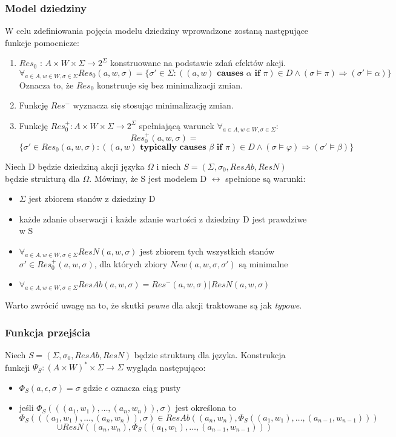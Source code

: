 \documentclass{article}
\begin{document}
\subsubsection{Model dziedziny}
W celu zdefiniowania pojęcia modelu dziedziny wprowadzone zostaną następujące funkcje pomocnicze:
\begin{enumerate}
	\item $Res_{0}$ : $A \times W \times \Sigma \to 2^{\Sigma}$ konstruowane na podstawie zdań efektów akcji.
	\[ \forall_{a \in A, w \in W, \sigma \in \Sigma} Res_{0}(a,w,\sigma) = \{\sigma' \in \Sigma: ((a, w) \textbf{ causes } \alpha \textbf{ if } \pi) \in D \land (\sigma \models \pi) \Rightarrow (\sigma' \models \alpha) \}  \]
	Oznacza to, że $Res_{0}$ konstruuje się bez minimalizacji zmian.
	\item Funkcję $Res^{-}$ wyznacza się stosując minimalizację zmian.
	\item Funkcję $Res_{0}^{+} : A \times W \times \Sigma \to 2^{\Sigma}$ spełniającą warunek $\forall_{a \in A, w \in W, \sigma \in \Sigma}$:
	\[ Res_{0}^{+}(a, w,\sigma) = \]
	\[ \{\sigma' \in Res_{0}(a, w,\sigma) : ((a, w) \textbf{ typically causes } \beta \textbf{ if } \pi) \in D \land (\sigma \models \varphi) \Rightarrow (\sigma' \models \beta) \}  \]
\end{enumerate}

Niech D będzie dziedziną akcji języka $\Omega$ i niech $S=(\Sigma, \sigma_{0}, ResAb, ResN)$ będzie strukturą dla $\Omega$. Mówimy, że S jest modelem D $\leftrightarrow$ spełnione są warunki:
\begin{itemize}
	\item $\Sigma$ jest zbiorem stanów z dziedziny D
	\item każde zdanie obserwacji i każde zdanie wartości z dziedziny D jest prawdziwe w S
	\item $\forall_{ a \in A, w \in W, \sigma \in \Sigma } ResN(a, w, \sigma)$ jest zbiorem tych wszystkich stanów $\sigma' \in Res_{0}^{+}(a, w, \sigma)$, dla których zbiory $New(a, w, \sigma, \sigma')$ są minimalne
	\item $\forall_{a \in A, w \in W, \sigma \in \Sigma} ResAb(a, w, \sigma) = Res^{-}(a, w, \sigma) | ResN(a, w, \sigma)$
\end{itemize}
Warto zwrócić uwagę na to, że skutki \textit{pewne} dla akcji traktowane są jak \textit{typowe}.

\subsubsection{Funkcja przejścia}
Niech $S=(\Sigma,\sigma_{0},ResAb,ResN)$ będzie strukturą dla języka. Konstrukcja funkcji $\Psi_{S} : (A \times W)^{*} \times \Sigma \to \Sigma$ wygląda następująco:
\begin{itemize}
	\item $\Phi_{S}(a,\epsilon,\sigma)=\sigma$ gdzie $\epsilon$ oznacza ciąg pusty
	\item jeśli $\Phi_{S}(((a_{1}, w_{1}), \dots, (a_{n}, w_{n})),\sigma)$ jest określona to
	\[\Phi_{S}(((a_{1}, w_{1}), \dots, (a_{n}, w_{n})),\sigma) \in ResAb((a_{n}, w_{n}), \Phi_{S}((a_{1}, w_{1}),\dots,(a_{n-1}, w_{n-1}))) \]
	\[ \cup ResN((a_{n}, w_{n}), \Phi_{S}((a_{1}, w_{1}),\dots,(a_{n-1}, w_{n-1})))\]
\end{itemize}
\end{document}
